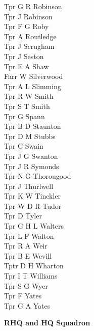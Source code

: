 \begin{multicols}{3}
  Tpr G R Robinson \\
  Tpr J Robinson \\
  Tpr F G Roby \\
  Tpr A Routledge \\
  Tpr J Scrugham \\
  Tpr J Seston \\
  Tpr E A Shaw \\
  Farr W Silverwood \\
  Tpr A L Slimming \\
  Tpr R W Smith \\
  Tpr S T Smith \\
  Tpr G Spann \\
  Tpr B D Staunton \\
  Tpr D M Stubbs \\
  Tpr C Swain \\
  Tpr J G Swanton \\
  Tpr J R Symonds \\
  Tpr N G Thorougood \\
  Tpr J Thurlwell \\
  Tpr K W Tinckler \\
  Tpr W D R Tudor \\
  Tpr D Tyler \\
  Tpr G H L Walters \\
  Tpr L F Walton \\
  Tpr R A Weir \\
  Tpr B E Wevill \\
  Tptr D H Wharton \\
  Tpr I T Williams \\
  Tpr S G Wyer \\
  Tpr F Yates \\
  Tpr G A Yates \\
\end{multicols}

\pagebreak

\vspace*{20mm}

\begin{center}
  \Large
  \textbf{RHQ and HQ Squadron}
\end{center}  

